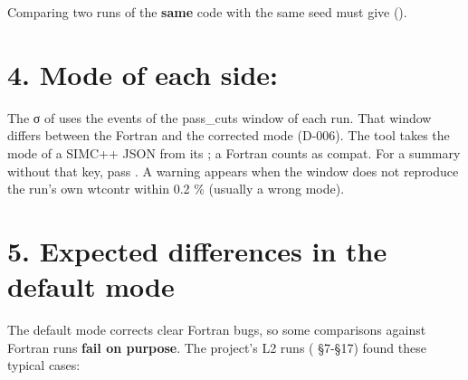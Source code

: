 Comparing two runs of the \textbf{same} code with the same seed must give  ().

\section*{\texorpdfstring{4. Mode of each side: }{4. Mode of each side: wtcontr}}\label{translation_report-useru5fcomparingu5fwithu5ffortran:4-mode-of-each-side-wtcontr}
The σ of  uses the events of the pass\_cuts window of each run. That window differs between the Fortran and the
corrected mode (D-006). The tool takes the mode of a SIMC++ JSON from its ; a Fortran  counts as
compat. For a summary without that key, pass . A warning appears when the window does
not reproduce the run's own wtcontr within 0.2 \% (usually a wrong mode).

\section*{\texorpdfstring{5. Expected differences in the default mode}{5. Expected differences in the default mode}}\label{translation_report-useru5fcomparingu5fwithu5ffortran:5-expected-differences-in-the-default-mode}
The default mode corrects clear Fortran bugs, so some comparisons against Fortran runs \textbf{fail on purpose}. The project's
L2 runs ( §7-§17) found these typical cases:

